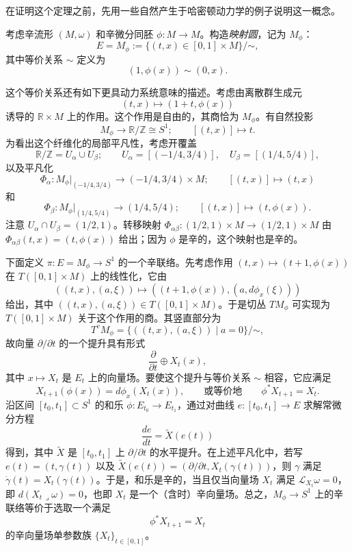 在证明这个定理之前，先用一些自然产生于哈密顿动力学的例子说明这一概念。

\begin{example}[映射圆]\label{ex:mapping-circle}
考虑辛流形 $(M,\omega)$ 和辛微分同胚 $\phi:M\to M$。构造\emph{映射圆}，记为 $M_\phi$：
\[
 E=M_\phi:=\{(t,x)\in[0,1]\times M\}/\mathord\sim,
\]
其中等价关系 $\sim$ 定义为
\[
 (1,\phi(x))\sim(0,x).
\]

这个等价关系还有如下更具动力系统意味的描述。考虑由离散群生成元
\[
 (t,x)\longmapsto(1+t,\phi(x))
\]
诱导的 $\mathbb R\times M$ 上的作用。这个作用是自由的，其商恰为
$M_\phi$。有自然投影
\[
 M_\phi\longrightarrow\mathbb R/\mathbb Z\cong S^1;
 \qquad [(t,x)]\longmapsto t.
\]
为看出这个纤维化的局部平凡性，考虑开覆盖
\[
 \mathbb R/\mathbb Z=U_\alpha\cup U_\beta;\qquad
 U_\alpha=[(-1/4,3/4)],\quad U_\beta=[(1/4,5/4)],
\]
以及平凡化
\[
 \Phi_\alpha:M_\phi|_{(-1/4,3/4)}
 \longrightarrow(-1/4,3/4)\times M;\qquad
 [(t,x)]\longmapsto(t,x)
\]
和
\[
 \Phi_\beta:M_\phi|_{(1/4,5/4)}
 \longrightarrow(1/4,5/4);\qquad
 [(t,x)]\longmapsto(t,\phi(x)).
\]
注意 $U_\alpha\cap U_\beta=(1/2,1)$。转移映射
$\Phi_{\alpha\beta}:(1/2,1)\times M\to(1/2,1)\times M$ 由
$\Phi_{\alpha\beta}(t,x)=(t,\phi(x))$ 给出；因为 $\phi$ 是辛的，这个映射也是辛的。

下面定义 $\pi:E=M_\phi\to S^1$ 的一个辛联络。先考虑作用
$(t,x)\mapsto(t+1,\phi(x))$ 在 $T([0,1]\times M)$ 上的线性化，它由
\[
 ((t,x),(a,\xi))\longmapsto
 ((t+1,\phi(x)),(a,d\phi_x(\xi)))
\]
给出，其中 $((t,x),(a,\xi))\in T([0,1]\times M)$。于是切丛
$TM_\phi$ 可实现为 $T([0,1]\times M)$ 关于这个作用的商。其竖直部分为
\[
 T^vM_\phi=\{((t,x),(a,\xi))\mid a=0\}/\mathord\sim,
\]
故向量 $\partial/\partial t$ 的一个提升具有形式
\[
 \frac{\partial}{\partial t}\oplus X_t(x),
\]
其中 $x\mapsto X_t$ 是 $E_t$ 上的向量场。要使这个提升与等价关系
$\sim$ 相容，它应满足
\[
 X_{t+1}(\phi(x))=d\phi_x(X_t(x)),
 \qquad\text{或等价地}\qquad
 \phi^*X_{t+1}=X_t.
\]
沿区间 $[t_0,t_1]\subset S^1$ 的和乐
$\phi:E_{t_0}\to E_{t_1}$，通过对曲线 $e:[t_0,t_1]\to E$ 求解常微分方程
\[
 \frac{de}{dt}=\widetilde X(e(t))
\]
得到，其中 $\widetilde X$ 是 $[t_0,t_1]$ 上 $\partial/\partial t$ 的水平提升。在上述平凡化中，若写
$e(t)=(t,\gamma(t))$ 以及
$\widetilde X(e(t))=(\partial/\partial t,X_t(\gamma(t)))$，则
$\gamma$ 满足 $\dot\gamma(t)=X_t(\gamma(t))$。于是，和乐是辛的，当且仅当向量场 $X_t$ 满足
$\mathcal L_{X_t}\omega=0$，即 $d(X_t\mathbin\lrcorner\omega)=0$，也即
$X_t$ 是一个（含时）辛向量场。总之，$M_\phi\to S^1$ 上的辛联络等价于选取一个满足
\[
 \phi^*X_{t+1}=X_t
\]
的辛向量场单参数族 $\{X_t\}_{t\in[0,1]}$。


\end{example}
